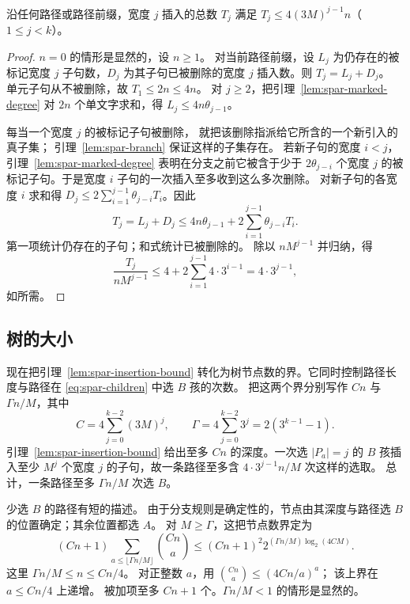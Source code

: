 \begin{lemma}\label{lem:spar-insertion-bound}
沿任何路径或路径前缀，宽度 $j$ 插入的总数 $T_j$
满足 $T_j\le4(3M)^{j-1}n$（$1\le j<k$）。
\end{lemma}
\begin{proof}
$n=0$ 的情形是显然的，设 $n\ge1$。
对当前路径前缀，设 $L_j$ 为仍存在的被标记宽度 $j$
子句数，$D_j$ 为其子句已被删除的宽度 $j$
插入数。则 $T_j=L_j+D_j$。
单元子句从不被删除，故 $T_1\le2n\le4n$。
对 $j\ge2$，把引理~\ref{lem:spar-marked-degree}
对 $2n$ 个单文字求和，得 $L_j\le4n\theta_{j-1}$。

每当一个宽度 $j$ 的被标记子句被删除，
就把该删除指派给它所含的一个新引入的真子集；
引理~\ref{lem:spar-branch} 保证这样的子集存在。
若新子句的宽度 $i<j$，引理~\ref{lem:spar-marked-degree}
表明在分支之前它被含于少于 $2\theta_{j-i}$
个宽度 $j$ 的被标记子句。于是宽度 $i$
子句的一次插入至多收到这么多次删除。
对新子句的各宽度 $i$ 求和得
$D_j\le2\sum_{i=1}^{j-1}\theta_{j-i}T_i$。因此
\begin{equation}\label{eq:spar-insertions}
 T_j=L_j+D_j\le4n\theta_{j-1}
       +2\sum_{i=1}^{j-1}\theta_{j-i}T_i.
\end{equation}
第一项统计仍存在的子句；和式统计已被删除的。
除以 $nM^{j-1}$ 并归纳，得
\[
 \frac{T_j}{nM^{j-1}}
 \le4+2\sum_{i=1}^{j-1}4\cdot3^{i-1}
 =4\cdot3^{j-1},
\]
如所需。
\end{proof}

\subsection{树的大小}
现在把引理~\ref{lem:spar-insertion-bound}
转化为树节点数的界。它同时控制路径长度与路径在
\eqref{eq:spar-children} 中选 $B$ 孩的次数。
把这两个界分别写作 $Cn$ 与 $\Gamma n/M$，其中
\[
 C=4\sum_{j=0}^{k-2}(3M)^j,\qquad
 \Gamma=4\sum_{j=0}^{k-2}3^j=2(3^{k-1}-1).
\]
引理~\ref{lem:spar-insertion-bound} 给出至多 $Cn$
的深度。一次选 $|P_a|=j$ 的 $B$ 孩插入至少 $M^j$
个宽度 $j$ 的子句，故一条路径至多含
$4\cdot3^{j-1}n/M$ 次这样的选取。
总计，一条路径至多 $\Gamma n/M$ 次选 $B$。

少选 $B$ 的路径有短的描述。
由于分支规则是确定性的，节点由其深度与路径选 $B$
的位置确定；其余位置都选 $A$。
对 $M\ge\Gamma$，这把节点数界定为
\[
 (Cn+1)\sum_{a\le\lfloor\Gamma n/M\rfloor}\binom{Cn}{a}
 \le (Cn+1)^2
       2^{(\Gamma n/M)\log_2(4CM)}.
\]
这里 $\Gamma n/M\le n\le Cn/4$。
对正整数 $a$，用 $\binom{Cn}{a}\le(4Cn/a)^a$；
该上界在 $a\le Cn/4$ 上递增。
被加项至多 $Cn+1$ 个。$\Gamma n/M<1$
的情形是显然的。

